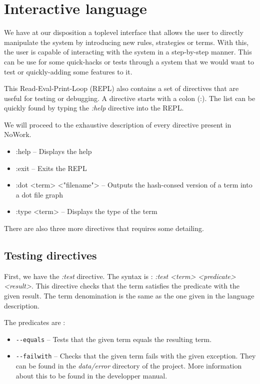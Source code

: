 \documentclass[12pt,a4paper]{article}
\begin{document}
\section{Interactive language}

We have at our disposition a toplevel interface that allows the user
to directly manipulate the system by introducing new rules, strategies
or terms. With this, the user is capable of interacting with the
system in a step-by-step manner. This can be use for some quick-hacks
or tests through a system that we would want to test or quickly-adding
some features to it.

This Read-Eval-Print-Loop (REPL) also contains a set of directives
that are useful for testing or debugging. A directive starts with a
colon (:). The list can be quickly found by typing the \emph{:help}
directive into the REPL.

We will proceed to the exhaustive description of every directive
present in NoWork.

\begin{itemize}
  \item :help -- Displays the help
  \item :exit -- Exits the REPL
  \item :dot <term> <"filename"> -- Outputs the hash-consed version of
    a term into a dot file graph
  \item :type <term> -- Displays the type of the term
\end{itemize}

There are also three more directives that requires some detailing.

\subsection{Testing directives}

First, we have the \emph{:test} directive. The syntax is : \emph{:test
  <term> <predicate> <result>}. This directive checks that the term
satisfies the predicate with the given result. The term denomination
is the same as the one given in the language description.

The predicates are : 
\begin{itemize}
\item \texttt{-{}-equals} -- Tests that the given term equals the resulting term.
\item \texttt{-{}-failwith} -- Checks that the given term fails with the
  given exception. They can be found in the \emph{data/error}
  directory of the project. More information about this to be found in
  the developper manual.
\end{itemize}
\end{document}
